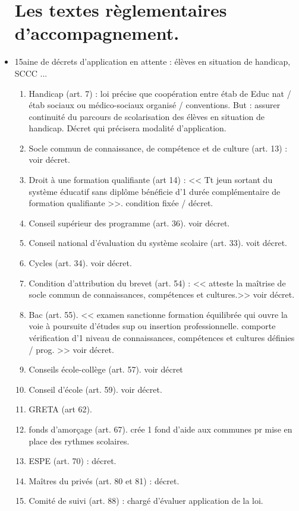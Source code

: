 \documentclass[12pt]{report}
\begin{document}
\begin{itemize}
\section{Les textes règlementaires d'accompagnement.}
\item 15aine de décrets d'application en attente : élèves en situation de handicap, SCCC ...
\begin{enumerate}
\item  Handicap (art. 7) : loi précise que coopération entre étab de Educ nat / étab sociaux ou médico-sociaux organisé / conventions. But : assurer continuité du parcours de scolarisation des élèves en situation de handicap. Décret qui précisera modalité d'application. \\
\item Socle commun de connaissance, de compétence et de culture (art. 13) : voir décret.\\
\item Droit à une formation qualifiante (art 14) : << Tt jeun sortant du système éducatif sans diplôme bénéficie d'1 durée complémentaire de formation qualifiante >>.  condition fixée / décret. \\
\item Conseil supérieur des programme (art. 36). voir décret. \\
\item Conseil national d'évaluation du système scolaire (art. 33). voit décret. \\
\item Cycles (art. 34). voir décret. \\
\item Condition d'attribution du brevet (art. 54) : << atteste la maîtrise de socle commun de connaissances, compétences et cultures.>> voir décret. \\
\item Bac (art. 55). << examen sanctionne formation équilibrée qui ouvre la voie à poursuite d'études sup ou insertion professionnelle. comporte vérification d'1 niveau de connaissances, compétences et cultures définies / prog. >> voir décret. \\
\item Conseils école-collège (art. 57). voir décret \\
\item Conseil d'école (art. 59). voir décret. \\
\item GRETA (art 62). \\
\item fonds d'amorçage (art. 67). crée 1 fond d'aide aux communes pr mise en place des rythmes scolaires. \\
\item ESPE (art. 70) : décret. \\
\item Maîtres du privés (art. 80 et 81) : décret.\\
\item Comité de suivi (art. 88) : chargé d'évaluer application de la loi.\\
\end{enumerate}


\end{itemize}
\end{document}
